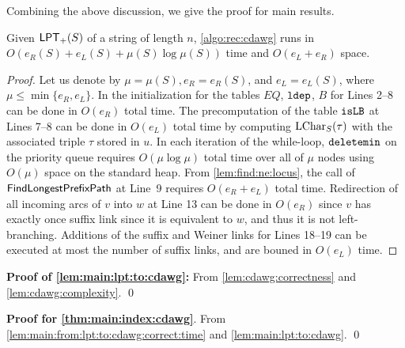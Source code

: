 \documentclass{article}
\begin{document}
Combining the above discussion, we give the proof for main results. 


\begin{lemmarep}\label{lem:cdawg:complexity}
  Given $\mathsf{LPT}_{+}(S)$ of a string of length $n$, 
  \cref{algo:rec:cdawg} runs in $O(e_R(S) + e_L(S) + \mu(S)\log \mu(S))$ time and $O(e_L + e_R)$ space. 
\end{lemmarep}

\begin{proof}
Let us denote by $\mu = \mu(S), e_R = e_R(S)$, and $e_L = e_L(S)$, where $\mu \le \min\{e_R, e_L\}$.
In the initialization for the tables $EQ$, $\mathtt{ldep}$, $B$ for Lines 2--8 can be done in $O(e_R)$ total time. The precomputation of the table $\mathtt{isLB}$ at Lines 7--8 can be done in $O(e_L)$ total time by computing $\mathrm{LChar}_{S}(\tau)$ with the associated triple $\tau$ stored in $u$. 
In each iteration of the while-loop, $\mathtt{deletemin}$ on the priority queue requires $O(\mu \log \mu)$ total time over all of $\mu$ nodes using $O(\mu)$ space on the standard heap.
From \cref{lem:find:ne:locus}, the call of $\textsf{FindLongestPrefixPath}$ at Line~9 requires $O(e_R + e_L)$ total time. Redirection of all incoming arcs of $v$ into $w$ at Line 13 can be done in $O(e_R)$ since $v$ has exactly once suffix link since it is equivalent to $w$, and thus it is not left-branching.
Additions of the suffix and Weiner links for Lines 18--19 can be executed at most the number of suffix links, and are bouned in $O(e_L)$ time.
\end{proof}

\begin{trivlist}\item[]
  \textbf{Proof of \cref{lem:main:lpt:to:cdawg}:}
  From \cref{lem:cdawg:correctness} and \cref{lem:cdawg:complexity}. 
\qed   
\end{trivlist}

\begin{trivlist}\item[]
  \textbf{Proof for \cref{thm:main:index:cdawg}}.
  From 
  \cref{lem:main:from:lpt:to:cdawg:correct:time}
  and
  \cref{lem:main:lpt:to:cdawg}. 
\qed
\end{trivlist}



\end{document}
